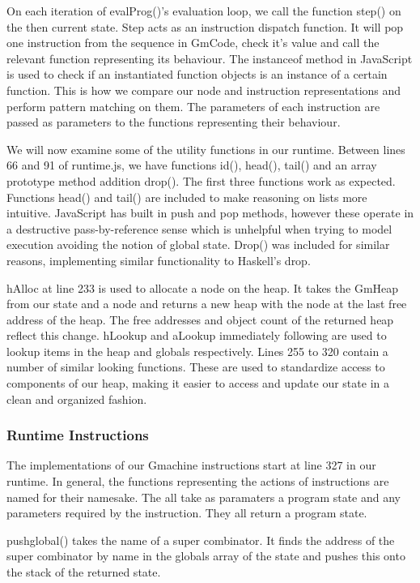 On each iteration of evalProg()'s evaluation loop, we
call the function step() on the then
current state. Step acts as an instruction dispatch function.
It will pop one instruction from the sequence
in GmCode, check it's value and call the relevant function 
representing its behaviour. The instanceof method in JavaScript
is used to check if an instantiated function objects is an
instance of a certain function. This is how we compare our
node and instruction representations and perform pattern 
matching on them. The parameters of each instruction are 
passed as parameters to the functions representing their
behaviour. 

We will now examine some of the utility functions in our
runtime. Between lines 66 and 91 of runtime.js, we have
functions id(), head(), tail() and an array prototype
method addition drop(). The first three functions work
as expected. Functions head() and tail() are included to
make reasoning on lists more intuitive. JavaScript has
built in push and pop methods, however these operate in
a destructive pass-by-reference sense which is unhelpful
when trying to model execution avoiding the notion of
global state. Drop() was included for similar reasons, 
implementing similar functionality to Haskell's drop.

hAlloc at line 233 is used to allocate a node on the
heap. It takes the GmHeap from our state and a node
and returns a new heap with the node at the last free
address of the heap. The free addresses and object
count of the returned heap reflect this change. 
hLookup and aLookup immediately following are used 
to lookup items in the heap and globals respectively. 
Lines 255 to 320 contain a number of similar looking 
functions. These are used to standardize access to 
components of our heap, making it easier to access and
update our state in a clean and organized fashion.

\subsubsection{Runtime Instructions}
The implementations of our Gmachine instructions start at
line 327 in our runtime. In general, the functions representing
the actions of instructions are named for their namesake. The
all take as paramaters a program state and any parameters
required by the instruction. They all return a program state.

pushglobal() takes the name of a super combinator. It finds 
the address of the super combinator by name in the globals 
array of the state and pushes this onto the stack of the returned
state.

